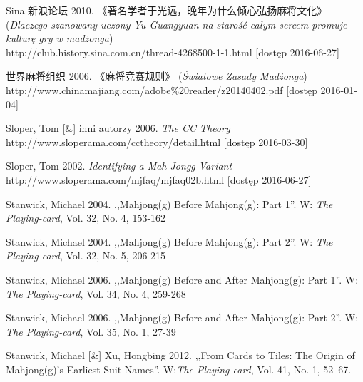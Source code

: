 Sina  新浪论坛 2010. 
《著名学者于光远，晚年为什么倾心弘扬麻将文化》(\textit{Dlaczego szanowany uczony Yu Guangyuan na
starość całym sercem promuje kulturę gry w madżonga})
\\http://club.history.sina.com.cn/thread-4268500-1-1.html [dostęp 2016-06-27]

 世界麻将组织 2006. 《麻将竞赛规则》 (\textit{Światowe Zasady Madżonga})
\\http://www.chinamajiang.com/adobe\%20reader/z20140402.pdf [dostęp 2016-01-04]

Sloper, Tom [\&] inni autorzy 2006. \textit{The CC Theory}
\\http://www.sloperama.com/cctheory/detail.html [dostęp
2016-03-30]

Sloper, Tom 2002. \textit{Identifying a Mah-Jongg Variant}
\\http://www.sloperama.com/mjfaq/mjfaq02b.html [dostęp
2016-06-27]

Stanwick, Michael 2004. ,,Mahjong(g) Before Mahjong(g): Part 1''. W:
\textit{The Playing-card}, Vol. 32, No. 4, 153-162

Stanwick, Michael 2004. ,,Mahjong(g) Before Mahjong(g): Part 2''. W:
\textit{The Playing-card}, Vol. 32, No. 5, 206-215

Stanwick, Michael 2006. ,,Mahjong(g) Before and After Mahjong(g): Part 1''. W:
\textit{The Playing-card}, Vol. 34, No. 4, 259-268

Stanwick, Michael 2006. ,,Mahjong(g) Before and After Mahjong(g): Part 2''. W:
\textit{The Playing-card}, Vol. 35, No. 1, 27-39


Stanwick, Michael [\&] Xu, Hongbing 2012. ,,From Cards to Tiles: The Origin of
Mahjong(g)’s Earliest Suit Names''. W:\textit{The Playing-card}, Vol. 41, No. 1,
52–67.


